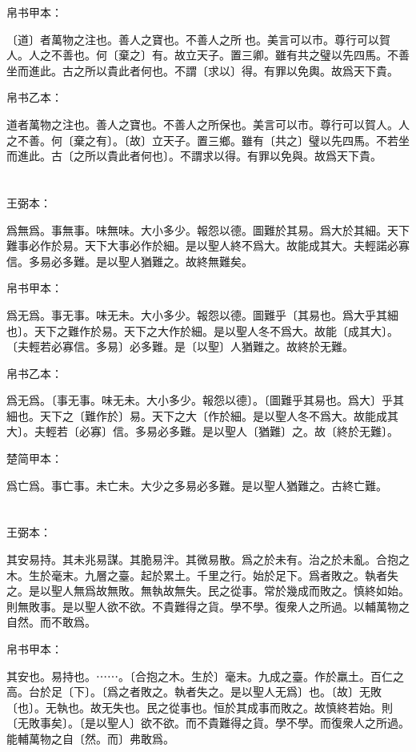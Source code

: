\documentclass[a5paper]{ctexbook}
\begin{document}
    
    帛书甲本：

    〔道〕者萬物之注也。善人之寶也。不善人之所󱀘也。美言可以市。尊行可以賀人。人之不善也。何〔棄之〕有。故立天子。置三卿。雖有共之璧以先四馬。不善坐而進此。古之所以貴此者何也。不謂〔求以〕得。有罪以免輿。故爲天下貴。

    帛书乙本：

    道者萬物之注也。善人之寶也。不善人之所保也。美言可以市。尊行可以賀人。人之不善。何〔棄之有〕。〔故〕立天子。置三鄉。雖有〔共之〕璧以先四馬。不若坐而進此。古〔之所以貴此者何也〕。不謂求以得。有罪以免與。故爲天下貴。

    \chapter{}
    王弼本：

    爲無爲。事無事。味無味。大小多少。報怨以德。圖難於其易。爲大於其細。天下難事必作於易。天下大事必作於細。是以聖人終不爲大。故能成其大。夫輕諾必寡信。多易必多難。是以聖人猶難之。故終無難矣。

    
    帛书甲本：

    爲无爲。事无事。味无未。大小多少。報怨以德。圖難乎〔其易也。爲大乎其細也〕。天下之難作於易。天下之大作於細。是以聖人冬不爲大。故能〔成其大〕。〔夫輕若必寡信。多易〕必多難。是〔以聖〕人猶難之。故終於无難。

    帛书乙本：

    爲无爲。〔事无事。味无未。大小多少。報怨以德〕。〔圖難乎其易也。爲大〕乎其細也。天下之〔難作於〕易。天下之大〔作於細。是以聖人冬不爲大。故能成其大〕。夫輕若〔必寡〕信。多易必多難。是以聖人〔猶難〕之。故〔終於无難〕。

    楚简甲本：

    爲亡爲。事亡事。未亡未。大少之多易必多難。是以聖人猶難之。古終亡難。

    \chapter{}
    王弼本：

    其安易持。其未兆易謀。其脆易泮。其微易散。爲之於未有。治之於未亂。合抱之木。生於毫末。九層之臺。起於累土。千里之行。始於足下。爲者敗之。執者失之。是以聖人無爲故無敗。無執故無失。民之從事。常於幾成而敗之。慎終如始。則無敗事。是以聖人欲不欲。不貴難得之貨。學不學。復衆人之所過。以輔萬物之自然。而不敢爲。

    
    帛书甲本：

    其安也。易持也。⋯⋯。〔合抱之木。生於〕毫末。九成之臺。作於羸土。百仁之高。台於足〔下〕。〔爲之者敗之。執者失之。是以聖人无爲〕也。〔故〕无敗〔也〕。无執也。故无失也。民之從事也。恒於其成事而敗之。故慎終若始。則〔无敗事矣〕。〔是以聖人〕欲不欲。而不貴難得之貨。學不學。而復衆人之所過。能輔萬物之自〔然。而〕弗敢爲。
\end{document}
